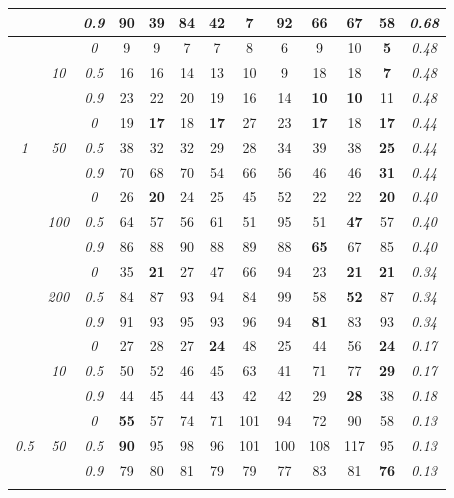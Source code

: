 \documentclass[12pt]{article}
\begin{document}
\begin{table}
\begin{center}
\begin{tabular}{ccc|cc|cc|cc|cc|c|c}
& & \it  0.9  & 90 & 39 & 84 & 42 & {\bf 7} & 92 & 66 & 67 & 58 & \it  0.68 \\[1ex]
\cline{2-3}\hline\rule{0pt}{3ex}
& & \it  0  & 9 & 9 & 7 & 7 & 8 & 6 & 9 & 10 & {\bf 5} & \it  0.48 \\
 & \it  10  & \it  0.5  & 16 & 16 & 14 & 13 & 10 & 9 & 18 & 18 & {\bf 7} & \it  0.48 \\
& & \it  0.9  & 23 & 22 & 20 & 19 & 16 & 14 & {\bf 10} & {\bf 10} & 11 & \it  0.48 \\[1ex]
\cline{2-3}\rule{0pt}{3ex}
& & \it  0  & 19 & {\bf 17} & 18 & {\bf 17} & 27 & 23 & {\bf 17} & 18 & {\bf 17} & \it  0.44 \\
\it  1  & \it  50  & \it  0.5  & 38 & 32 & 32 & 29 & 28 & 34 & 39 & 38 & {\bf 25} & \it  0.44 \\
& & \it  0.9  & 70 & 68 & 70 & 54 & 66 & 56 & 46 & 46 & {\bf 31} & \it  0.44 \\[1ex]
\cline{2-3}\rule{0pt}{3ex}
& & \it  0  & 26 & {\bf 20} & 24 & 25 & 45 & 52 & 22 & 22 & {\bf 20} & \it  0.40 \\
 & \it  100  & \it  0.5  & 64 & 57 & 56 & 61 & 51 & 95 & 51 & {\bf 47} & 57 & \it  0.40 \\
& & \it  0.9  & 86 & 88 & 90 & 88 & 89 & 88 & {\bf 65} & 67 & 85 & \it  0.40 \\[1ex]
\cline{2-3}\rule{0pt}{3ex}
& & \it  0  & 35 & {\bf 21} & 27 & 47 & 66 & 94 & 23 & {\bf 21} & {\bf 21} & \it  0.34 \\
 & \it  200  & \it  0.5  & 84 & 87 & 93 & 94 & 84 & 99 & 58 & {\bf 52} & 87 & \it  0.34 \\
& & \it  0.9  & 91 & 93 & 95 & 93 & 96 & 94 & {\bf 81} & 83 & 93 & \it  0.34 \\[1ex]
\cline{2-3}\hline\rule{0pt}{3ex}
& & \it  0  & 27 & 28 & 27 & {\bf 24} & 48 & 25 & 44 & 56 & {\bf 24} & \it  0.17 \\
 & \it  10  & \it  0.5  & 50 & 52 & 46 & 45 & 63 & 41 & 71 & 77 & {\bf 29} & \it  0.17 \\
& & \it  0.9  & 44 & 45 & 44 & 43 & 42 & 42 & 29 & {\bf 28} & 38 & \it  0.18 \\[1ex]
\cline{2-3}\rule{0pt}{3ex}
& & \it  0  & {\bf 55} & 57 & 74 & 71 & 101 & 94 & 72 & 90 & 58 & \it  0.13 \\
\it  0.5  & \it  50  & \it  0.5  & {\bf 90} & 95 & 98 & 96 & 101 & 100 & 108 & 117 & 95 & \it  0.13 \\
& & \it  0.9  & 79 & 80 & 81 & 79 & 79 & 77 & 83 & 81 & {\bf 76} & \it  0.13 \\[1ex]
\cline{2-3}\rule{0pt}{3ex}

\end{tabular}
\end{center}
\end{table}
\end{document}
